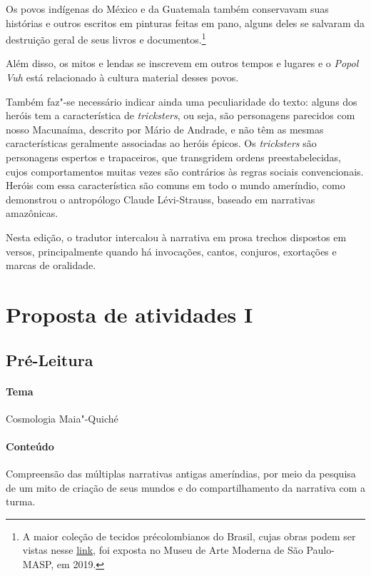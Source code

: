 \documentclass[12pt]{extarticle}
\begin{document}
Os povos indígenas do México e da Guatemala também conservavam suas histórias e outros escritos em pinturas feitas em pano, alguns deles se salvaram da destruição geral de seus livros e documentos.\footnote{A maior coleção de tecidos précolombianos do Brasil, cujas obras podem ser vistas nesse \href{https://masp.org.br/exposicoes/acervo-em-transformacao-comodato-masp-landmann-texteis-pre-colombianos}{link}, foi exposta no Museu de Arte Moderna de São Paulo-MASP, em 2019.}

Além disso, os mitos e lendas se inscrevem em outros tempos e lugares e o 
\textit{Popol Vuh} está relacionado à cultura material desses povos.

Também faz"-se necessário indicar ainda uma peculiaridade do texto: alguns dos heróis tem a característica de \textit{tricksters}, ou seja, são personagens parecidos com nosso Macunaíma, descrito por Mário de Andrade, e não têm as mesmas características geralmente associadas ao heróis épicos. Os \textit{tricksters} são personagens espertos e trapaceiros, que transgridem ordens preestabelecidas, cujos comportamentos muitas vezes são contrários às regras sociais convencionais.
Heróis com essa característica são comuns em todo o mundo ameríndio, como demonstrou o antropólogo Claude Lévi-Strauss, baseado em narrativas amazônicas.

Nesta edição, o tradutor intercalou à narrativa em prosa trechos dispostos em versos, principalmente quando há invocações, cantos, conjuros, exortações e marcas de oralidade.


\section{Proposta de atividades I}

\subsection{Pré-Leitura}

\paragraph{Tema} Cosmologia Maia"-Quiché

\paragraph{Conteúdo} Compreensão das múltiplas narrativas antigas ameríndias, por meio da pesquisa 
de um mito de criação de seus mundos e do compartilhamento da narrativa com a turma.
\end{document}
